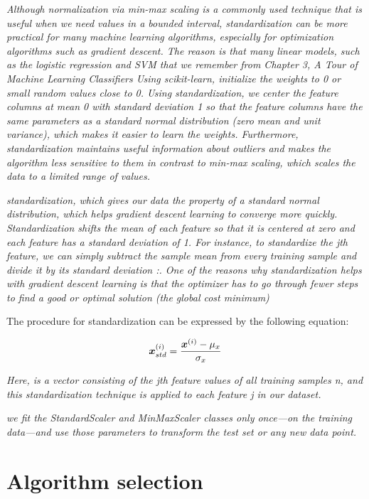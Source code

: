 \textit{Although normalization via min-max scaling is a commonly used technique that is useful when we need values in a bounded interval, standardization can be more practical for many machine learning algorithms, especially for optimization algorithms such as gradient descent. The reason is that many linear models, such as the logistic regression and SVM that we remember from Chapter 3, A Tour of Machine Learning Classifiers Using scikit-learn, initialize the weights to 0 or small random values close to 0. Using standardization, we center the feature columns at mean 0 with standard deviation 1 so that the feature columns have the same parameters as a standard normal distribution (zero mean and unit variance), which makes it easier to learn the weights. Furthermore, standardization maintains useful information about outliers and makes the algorithm less sensitive to them in contrast to min-max scaling, which scales the data to a limited range of values.}

\textit{standardization, which gives our data the property of a standard normal distribution, which helps gradient descent learning to converge more quickly. Standardization shifts the mean of each feature so that it is centered at zero and each feature has a standard deviation of 1. For instance, to standardize the jth feature, we can simply subtract the sample mean  from every training sample and divide it by its standard deviation :. One of the reasons why standardization helps with gradient descent learning is that the optimizer has to go through fewer steps to find a good or optimal solution (the global cost minimum)}

The procedure for standardization can be expressed by the following equation:

\begin{equation} \label{eq:standardization}
    \boldsymbol{x}^{(i)}_{std} = \frac{\boldsymbol{x}^{(i)} - \mu_x}{\sigma_x}
\end{equation}

\textit{Here,  is a vector consisting of the jth feature values of all training samples n, and this standardization technique is applied to each feature j in our dataset.}

\textit{we fit the StandardScaler and MinMaxScaler classes only once—on the training data—and use those parameters to transform the test set or any new data point.}

\section{Algorithm selection} \label{sec:algorithm_selection}

